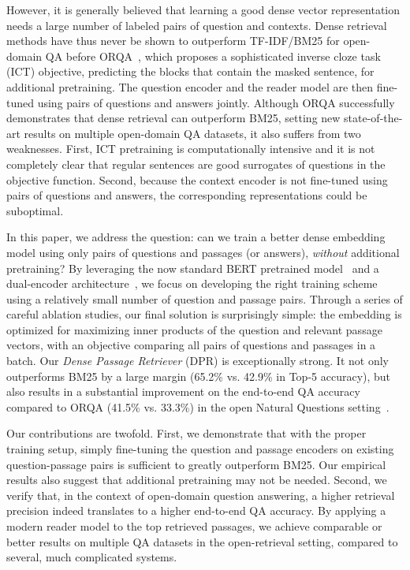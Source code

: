 However, it is generally believed that learning a good dense vector representation needs a large number of labeled pairs of question and contexts.
Dense retrieval methods have thus never be shown to outperform TF-IDF/BM25 for open-domain QA before ORQA~\cite{lee2019latent}, which proposes a sophisticated inverse cloze task (ICT) objective, predicting the blocks that contain the masked sentence, for additional pretraining.
The question encoder and the reader model are then fine-tuned using pairs of questions and answers jointly. %
Although ORQA successfully demonstrates that dense retrieval can outperform BM25, setting new state-of-the-art results on multiple open-domain QA datasets,
it also suffers from two weaknesses.
First, ICT pretraining is computationally intensive and it is not completely clear that regular sentences are good surrogates of questions in the objective function.
Second, because the context encoder is not fine-tuned using pairs of questions and answers, the corresponding representations could be suboptimal.


In this paper, we address the question: can we train a better dense embedding model using only pairs of questions and passages (or answers), \emph{without} additional pretraining?
By leveraging the now standard BERT pretrained model~\cite{devlin2018bert} and a dual-encoder architecture~\cite{bromley1994signature}, we focus on developing the right training scheme using a relatively small number of question and passage pairs. %
Through a series of careful ablation studies, our final solution is surprisingly simple: the embedding is optimized for maximizing inner products of the question and relevant passage vectors, with an objective comparing all pairs of questions and passages in a batch.
Our \emph{Dense Passage Retriever} (DPR) is exceptionally strong. It not only outperforms BM25 by a large margin (65.2\% vs. 42.9\% in Top-5 accuracy), but also results in a substantial improvement on the end-to-end QA accuracy compared to ORQA (41.5\% vs. 33.3\%) in the open Natural Questions setting~\cite{lee2019latent,kwiatkowski2019natural}.


Our contributions are twofold.
First, we demonstrate that with the proper training setup, simply fine-tuning the question and passage encoders on existing question-passage pairs
is sufficient to greatly outperform BM25.
Our empirical results also suggest that additional pretraining may not be needed.
Second, we verify that, in the context of open-domain question answering, a higher retrieval precision indeed translates to a higher end-to-end QA accuracy.
By applying a modern reader model to the top retrieved passages, we achieve comparable or better results on multiple QA datasets in the open-retrieval setting,
compared to several, much complicated systems.


